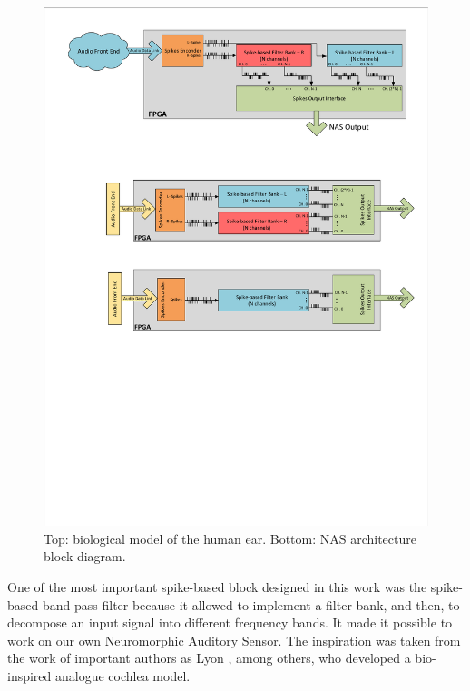 \begin{figure}[H]
\begin{minipage}[b]{1\textwidth}
    \includegraphics[width=1\textwidth]{NAS_full_arch_stereo.pdf}
    \caption{Top: biological model of the human ear. Bottom: NAS architecture block diagram.}
    \label{fig:nas_block_diagram}
  \end{minipage}
\end{figure}

One of the most important spike-based block designed in this work was the spike-based band-pass filter because it allowed to implement a filter bank, and then, to decompose an input signal into different frequency bands. It made it possible to work on our own Neuromorphic Auditory Sensor. The inspiration was taken from the work of important authors as Lyon \cite{lyon1988analog}, among others, who developed a bio-inspired analogue cochlea model.


